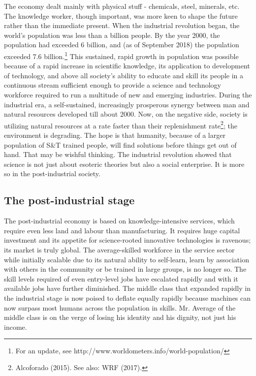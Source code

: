 \begin{multicols}{2}
The economy dealt mainly with physical stuff - chemicals, steel, minerals, etc. The knowledge worker, though important, was more keen to shape the future rather than the immediate present. When the industrial revolution began, the world's population was less than a billion people. By the year 2000, the population had exceeded 6 billion, and (as of September 2018) the population exceeded 7.6 billion.\footnote{For an update, see http://www.worldometers.info/world-population/} This sustained, rapid growth in population was possible because of a rapid increase in scientific knowledge, its application to development of technology, and above all society's ability to educate and skill its people in a continuous stream sufficient enough to provide a science and technology workforce required to run a multitude of new and emerging industries. During the industrial era, a self-sustained, increasingly prosperous synergy between man and natural resources developed till about 2000. Now, on the negative side, society is utilizing natural resources at a rate faster than their replenishment rate\footnote{Alcoforado (2015). See also: WRF (2017).}; the environment is degrading. The hope is that humanity, because of a larger population of S\&T trained people, will find solutions before things get out of hand. That may be wishful thinking. The industrial revolution showed that science is not just about esoteric theories but also a social enterprise. It is more so in the post-industrial society.

\subsection*{The post-industrial stage}

The post-industrial economy is based on knowledge-intensive services, which require even less land and labour than manufacturing. It requires huge capital investment and its appetite for science-rooted innovative technologies is ravenous; its market is truly global. The average-skilled workforce in the service sector while initially scalable due to its natural ability to self-learn, learn by association with others in the community or be trained in large groups, is no longer so. The skill levels required of even entry-level jobs have escalated rapidly and with it available jobs have further diminished. The middle class that expanded rapidly in the industrial stage is now poised to deflate equally rapidly because machines can now surpass most humans across the population in skills. Mr. Average of the middle class is on the verge of losing his identity and his dignity, not just his income.


\end{multicols}

